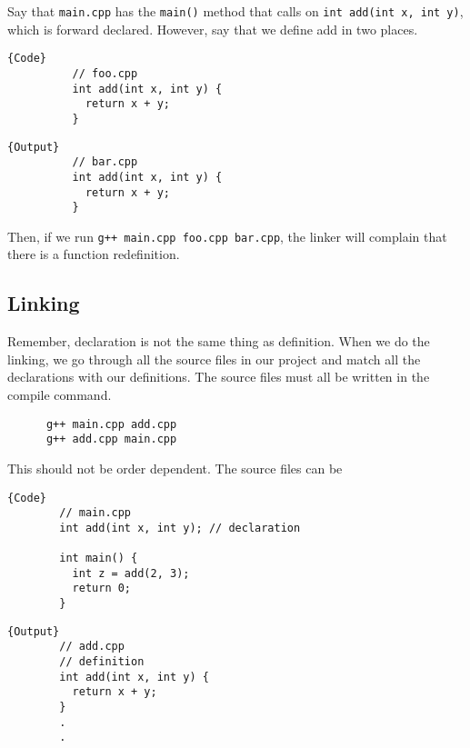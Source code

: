 \documentclass{article}
\begin{document}
    \begin{example}
      Say that \texttt{main.cpp} has the \texttt{main()} method that calls on \texttt{int add(int x, int y)}, which is forward declared. However, say that we define add in two places. 

      \noindent\begin{minipage}{.5\textwidth}
        \begin{lstlisting}[]{Code}
          // foo.cpp 
          int add(int x, int y) {
            return x + y; 
          }
        \end{lstlisting}
        \end{minipage}
        \hfill
        \begin{minipage}{.49\textwidth}
        \begin{lstlisting}[]{Output}
          // bar.cpp 
          int add(int x, int y) {
            return x + y; 
          }
        \end{lstlisting}
      \end{minipage}
      Then, if we run \texttt{g++ main.cpp foo.cpp bar.cpp}, the linker will complain that there is a function redefinition. 
    \end{example}

  \subsection{Linking} 

    Remember, declaration is not the same thing as definition. When we do the linking, we go through all the source files in our project and match all the declarations with our definitions. The source files must all be written in the compile command. 

    \begin{lstlisting}
      g++ main.cpp add.cpp
      g++ add.cpp main.cpp
    \end{lstlisting}

    This should not be order dependent. The source files can be 

    \noindent\begin{minipage}{.5\textwidth}
      \begin{lstlisting}[]{Code}
        // main.cpp 
        int add(int x, int y); // declaration

        int main() {  
          int z = add(2, 3); 
          return 0; 
        }
      \end{lstlisting}
      \end{minipage}
      \hfill
      \begin{minipage}{.49\textwidth}
      \begin{lstlisting}[]{Output}
        // add.cpp
        // definition
        int add(int x, int y) { 
          return x + y;
        }
        .
        .
      \end{lstlisting}
    \end{minipage}
  
\end{document}
